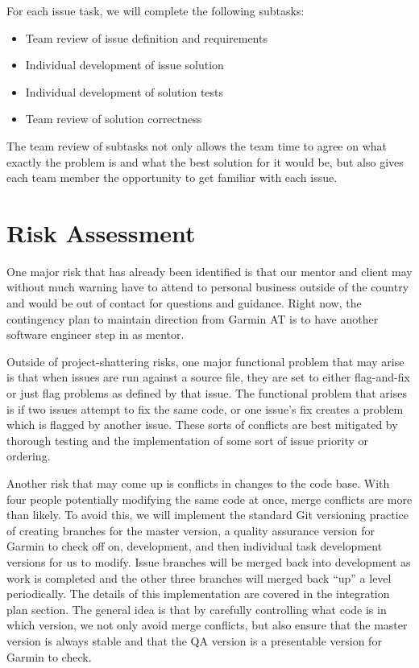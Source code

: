 \documentclass[11pt]{scrreprt}
\begin{document}
For each issue task, we will complete the following subtasks:
\begin{itemize}
	\item Team review of issue definition and requirements
	\item Individual development of issue solution
	\item Individual development of solution tests
	\item Team review of solution correctness
\end{itemize}

The team review of subtasks not only allows the team time to agree on what exactly the problem is and what the best solution for it would be, but also gives each team member the opportunity to get familiar with each issue.

\section{Risk Assessment}
One major risk that has already been identified is that our mentor and client may without much warning have to attend to personal business outside of the country and would be out of contact for questions and guidance. Right now, the contingency plan to maintain direction from Garmin AT is to have another software engineer step in as mentor.

Outside of project-shattering risks, one major functional problem that may arise is that when issues are run against a source file, they are set to either flag-and-fix or just flag problems as defined by that issue. The functional problem that arises is if two issues attempt to fix the same code, or one issue's fix creates a problem which is flagged by another issue. These sorts of conflicts are best mitigated by thorough testing and the implementation of some sort of issue priority or ordering.

Another risk that may come up is conflicts in changes to the code base. With four people potentially modifying the same code at once, merge conflicts are more than likely. To avoid this, we will implement the standard Git versioning practice of creating branches for the master version, a quality assurance version for Garmin to check off on, development, and then individual task development versions for us to modify. Issue branches will be merged back into development as work is completed and the other three branches will merged back ``up'' a level periodically. The details of this implementation are covered in the integration plan section. The general idea is that by carefully controlling what code is in which version, we not only avoid merge conflicts, but also ensure that the master version is always stable and that the QA version is a presentable version for Garmin to check.
\end{document}
